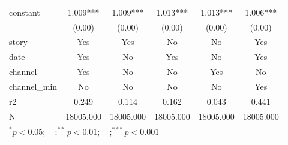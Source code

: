 \begin{tabular}{l*{5}{c}}
constant            &       1.009***&       1.009***&       1.013***&       1.013***&       1.006***\\
                    &      (0.00)   &      (0.00)   &      (0.00)   &      (0.00)   &      (0.00)   \\
\midrule
story               &         Yes   &         Yes   &          No   &          No   &         Yes   \\
date                &         Yes   &          No   &         Yes   &          No   &         Yes   \\
channel             &         Yes   &          No   &          No   &         Yes   &          No   \\
channel\_min         &          No   &          No   &          No   &          No   &         Yes   \\
r2                  &       0.249   &       0.114   &       0.162   &       0.043   &       0.441   \\
N                   &   18005.000   &   18005.000   &   18005.000   &   18005.000   &   18005.000   \\
\bottomrule
\multicolumn{6}{l}{\footnotesize $^{*}p<0.05; \quad ; ^{**} p<0.01; \quad ; ^{***}p<0.001$}\\
\end{tabular}
